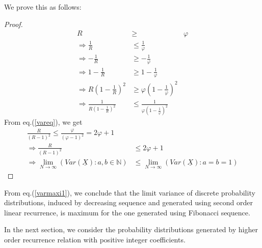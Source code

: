 \begin{multicols}{2}
We prove this as follows:

\vspace{-.5cm}

\begin{proof}\renewcommand{\qedsymbol}{} 
\begin{align}
 R &\ge& \varphi\nonumber\\
 \Rightarrow \frac{1}{R} &\le \frac{1}{\varphi}\nonumber\\
\Rightarrow -\frac{1}{R} &\ge - \frac{1}{\varphi}\nonumber\\
\Rightarrow 1-\frac{1}{R} &\ge 1 - \frac{1}{\varphi}\nonumber\\
\Rightarrow R\left(1-\frac{1}{R}\right)^2 &\ge \varphi\left(1 - \frac{1}{\varphi}\right)^2\nonumber\\
\Rightarrow \frac{1}{R\left(1-\frac{1}{R}\right)^2} &\le \frac{1}{\varphi\left(1 - \frac{1}{\varphi}\right)^2}\label{eq-10.6}
\end{align}
From eq.(\ref{vareq}), we get 
{\fontsize{8}{9}\selectfont\begin{align}
\frac{R}{(R-1)^2} \le \frac{\varphi}{(\varphi-1)^2} = 2\varphi + 1\nonumber\\
\Rightarrow \frac{R}{(R-1)^2} &\le 2\varphi + 1\label{eq-10.7}\\
\Rightarrow \lim_{N\rightarrow \infty} \left(Var(\underline{X}):a,b\in \mathbb N\right) &\leq \lim_{N\rightarrow \infty}\left(Var(\underline{X}): a = b = 1\right)\label{eq-10.8}
\end{align}}
\end{proof}

\vspace{-.7cm}

From eq.(\ref{varmaxi1}), we conclude that the limit variance of discrete probability distributions, induced by decreasing sequence and generated using second order linear recurrence, is maximum for the one generated using Fibonacci sequence.

In the next section, we consider the probability distributions generated by higher order recurrence relation with positive integer coefficients.


\end{multicols}
